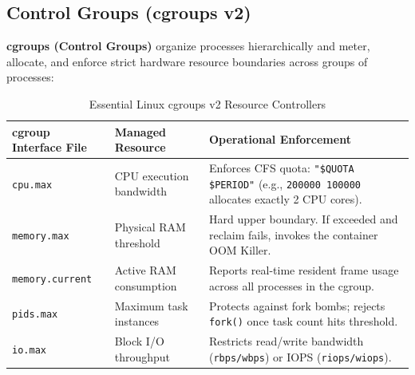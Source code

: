 \subsection{Control Groups (cgroups v2)}
\textbf{cgroups (Control Groups)} organize processes hierarchically and meter, allocate, and enforce strict hardware resource boundaries across groups of processes:
\begin{table}[htbp]
\centering
\small
\caption{Essential Linux cgroups v2 Resource Controllers}
\label{tab:cgroups_v2}
\begin{tabularx}{\textwidth}{l p{3.5cm} X}
\toprule
\textbf{cgroup Interface File} & \textbf{Managed Resource} & \textbf{Operational Enforcement} \\
\midrule
\texttt{cpu.max} & CPU execution bandwidth & Enforces CFS quota: \texttt{"\$QUOTA \$PERIOD"} (e.g., \texttt{200000 100000} allocates exactly 2 CPU cores). \\
\texttt{memory.max} & Physical RAM threshold & Hard upper boundary. If exceeded and reclaim fails, invokes the container OOM Killer. \\
\texttt{memory.current} & Active RAM consumption & Reports real-time resident frame usage across all processes in the cgroup. \\
\texttt{pids.max} & Maximum task instances & Protects against fork bombs; rejects \texttt{fork()} once task count hits threshold. \\
\texttt{io.max} & Block I/O throughput & Restricts read/write bandwidth (\texttt{rbps/wbps}) or IOPS (\texttt{riops/wiops}). \\
\bottomrule
\end{tabularx}
\end{table}

